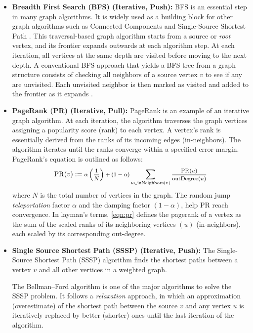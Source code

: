 \documentclass[sigconf, nonacm]{acmart}
\DeclareMathOperator{\PR}{PR}
\DeclareMathOperator{\inNeighbors}{inNeighbors}
\DeclareMathOperator{\outDegree}{outDegree}
\DeclareMathOperator*{\Sum}{\mathlarger{\sum}}
\begin{document}
\begin{itemize}[topsep=2pt,itemsep=2pt,wide]
\item \textbf{Breadth First Search (BFS) (Iterative, Push): }
BFS is an essential step in many graph algorithms. It is widely used as a building block for other graph algorithms such as  Connected Components and Single-Source Shortest Path \cite{beamer_direction-optimizing_2012}.
This traversal-based graph algorithm starts from a source or \emph{root} vertex, and its frontier expands outwards at each algorithm step. At each iteration, all vertices at the same depth are visited before moving to the next depth. A conventional BFS approach that yields a BFS tree from a graph structure consists of checking all neighbors of a source vertex $v$ to see if any are unvisited. Each unvisited neighbor is then marked as visited and added to the frontier as it expands \cite{beamer_gap_2017,besta_push_2017}.


\item \textbf{PageRank (PR) (Iterative, Pull): }
PageRank \cite{page_pagerank_1999,brin_anatomy_1998,bianchini_inside_2005,beamer_gap_2017} is an example of an iterative graph algorithm. At each iteration, the algorithm traverses the graph vertices assigning a popularity score (rank) to each vertex. A vertex's rank is essentially derived from the ranks of its incoming edges (in-neighbors). The algorithm iterates until the ranks converge within a specified error margin. PageRank's equation is outlined as follows:
\begin{equation}\label{eqn:pr}
	{
		\PR(v) := \text{\footnotesize $  \alpha \left ( \frac{1}{N} \right ) +(1-\alpha) \Sum_{u\in \inNeighbors(v)} \frac{\PR(u)}{\outDegree(u)} $}
	}
\end{equation} %
where ${N}$ is the total number of vertices in the graph. The random jump \emph{teleportation} factor $\alpha$ and the damping factor $(1-\alpha)$, help PR reach convergence. In layman's terms, \eqref{eqn:pr} defines the pagerank of a vertex as the sum of the scaled ranks of its neighboring vertices $(u)$ (in-neighbors), each scaled by its corresponding out-degree.

\item \textbf{Single Source Shortest Path (SSSP) (Iterative, Push): }
The Single-Source Shortest Path (SSSP) algorithm finds the shortest paths between a vertex $v$ and all other vertices in a weighted graph.

The Bellman–Ford algorithm \cite{bellman_routing_1958,ford_jr_network_1956} is one of the major algorithms to solve the SSSP problem. It follows a \emph{relaxation} approach, in which an approximation (overestimate) of the shortest path between the source $v$ and any vertex $u$ is iteratively replaced by better (shorter) ones until the last iteration of the algorithm. 


\end{itemize}
\end{document}
